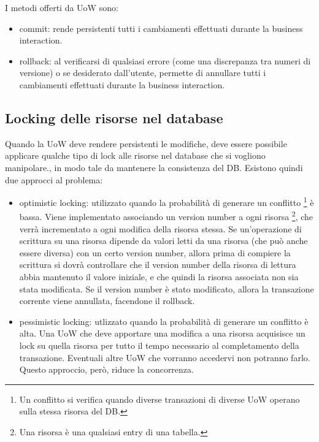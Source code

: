 I metodi offerti da UoW sono:
\begin{itemize}
    \item commit: rende persistenti tutti i cambiamenti effettuati durante la business interaction.
    \item rollback: al verificarsi di qualsiasi errore (come una discrepanza tra numeri di versione) o se desiderato dall'utente, permette di annullare tutti i cambiamenti effettuati durante la business interaction.
\end{itemize}

\subsection{Locking delle risorse nel database}
Quando la UoW deve rendere persistenti le modifiche, deve essere possibile applicare qualche tipo di lock alle risorse nel database che si vogliono manipolare., in modo tale da mantenere la consistenza del DB.
Esistono quindi due approcci al problema:
\begin{itemize}
    \item optimistic locking: utilizzato quando la probabilità di generare un conflitto \footnote{Un conflitto si verifica quando diverse transazioni di diverse UoW operano sulla stessa risorsa del DB.} è bassa. Viene implementato associando un version number a ogni risorsa \footnote{Una risorsa è una qualsiasi entry di una tabella.}, che verrà incrementato a ogni modifica della risorsa stessa.
    Se un'operazione di scrittura su una risorsa dipende da valori letti da una risorsa (che può anche essere diversa) con un certo version number, allora prima di compiere la scrittura si dovrà controllare che il version number della risorsa di lettura abbia mantenuto il valore iniziale, e che quindi la risorsa associata non sia stata modificata. Se il version number è stato modificato, allora la transazione corrente viene annullata, facendone il rollback.
    \item pessimistic locking: utlizzato quando la probabilità di generare un conflitto è alta. Una UoW che deve apportare una modifica a una risorsa acquisisce un lock su quella risorsa per tutto il tempo necessario al completamento della transazione. Eventuali altre UoW che vorranno accedervi non potranno farlo. Questo approccio, però, riduce la concorrenza.
\end{itemize}

